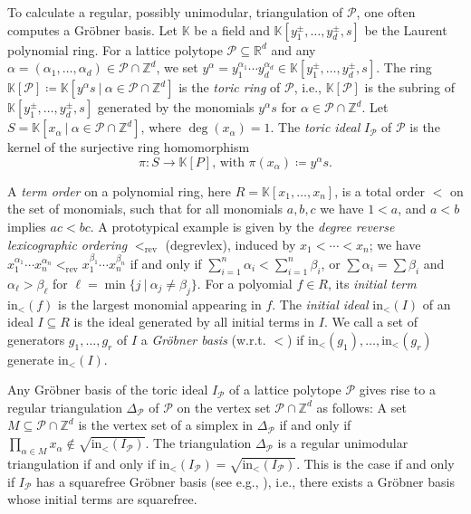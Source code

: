 \documentclass[12pt]{amsart}
\newcommand{\Z}{\mathbb{Z}}
\newcommand{\R}{\mathbb{R}}
\newcommand{\Pc}{\mathcal{P}}
\renewcommand{\P}{\mathcal{P}}
\newcommand{\init}{\mathrm{in}}
\newcommand{\rev}{\mathrm{rev}}
\begin{document}
To calculate a regular, possibly unimodular, triangulation of $\Pc$, one often computes a Gr\"obner basis. Let $\mathbb{K}$ be a field and $\mathbb{K}[y_1^{\pm},\ldots,y_d^{\pm},s]$ be the Laurent polynomial ring. For a lattice polytope $\Pc\subseteq \R^d$ and any $\alpha=(\alpha_1,\ldots,\alpha_d)\in \Pc\cap \Z^d$, we set $y^\alpha=y_1^{\alpha_1}\cdots y_d^{\alpha_d} \in \mathbb{K}[y_1^{\pm},\ldots,y_d^{\pm},s]$. The ring  $\mathbb{K}[\P]\coloneqq \mathbb{K}[y^\alpha s~|~\alpha\in \Pc\cap \Z^d]$ is the \emph{toric ring} of $\Pc$, i.e., $\mathbb{K}[\P]$ is the subring of $\mathbb{K}[y_1^{\pm},\ldots,y_d^{\pm},s]$ generated by the monomials $y^\alpha s$ for $\alpha\in \Pc\cap \Z^d$. Let $S=\mathbb{K}[x_\alpha~|~\alpha\in \Pc\cap \Z^d]$, where $\deg(x_\alpha)=1$. The \emph{toric ideal} $I_{\Pc}$ of $\Pc$ is the kernel of the surjective ring homomorphism
\[
\pi \colon S\to \mathbb{K}[P] \text{, with } \pi(x_\alpha) \coloneqq y^\alpha s.
\]

A \emph{term order} on a polynomial ring, here $R=\mathbb{K}[x_1,\ldots,x_n]$, is a  total order $<$ on the set of monomials, such that for all monomials $a,b,c$ we have $1<a$, and $a<b$ implies $ac<bc$. A prototypical example is given by the \emph{degree reverse lexicographic ordering} $<_{\rev}$ (degrevlex), induced by $x_1<\cdots < x_n$; we have $x_1^{\alpha_1}\cdots x_n^{\alpha_n}<_{\rev}x_1^{\beta_1}\cdots x_n^{\beta_n}$  if and only if $\sum_{i=1}^n \alpha_i<\sum_{i=1}^n \beta_i$, or  $\sum \alpha_i=\sum \beta_i$ and $\alpha_\ell>\beta_\ell$ for $\ell=\min\{j~|~\alpha_j\neq \beta_j\}$. For a polyomial $f\in R$, its \emph{initial term} $\init_<(f)$ is the largest monomial appearing in $f$. The \emph{initial ideal} $\init_<(I)$ of an ideal $I\subseteq R$ is the ideal generated by all initial terms in $I$. We call a set of  generators $g_1,\ldots,g_r$ of $I$ a \emph{Gr\"obner basis} (w.r.t. $<$) if $\init_<(g_1),\ldots,\init_<(g_r)$ generate $\init_<(I)$. 

Any Gr\"obner basis of the toric ideal $I_{\Pc}$ of a lattice polytope $\Pc$ gives rise to a regular triangulation $\Delta_{\Pc}$ of $\Pc$ on the vertex set $\Pc\cap \Z^d$  as follows: A  set $M\subseteq \Pc\cap \Z^d$ is the vertex set of a simplex in $\Delta_{\Pc}$ if and only if $\prod_{\alpha\in M}x_\alpha\notin \sqrt{\init_<(I_{\Pc})}$. The triangulation $\Delta_{\Pc}$ is a regular unimodular triangulation if and only if $\init_<(I_{\Pc})=\sqrt{\init_<(I_{\Pc})}$. This is the case if and only if $I_{\Pc}$ has a squarefree Gr\"obner basis (see e.g., \cite[Corollary 8.9]{Sturmfels}), i.e., there exists a Gr\"obner basis whose initial terms are squarefree.
\end{document}
